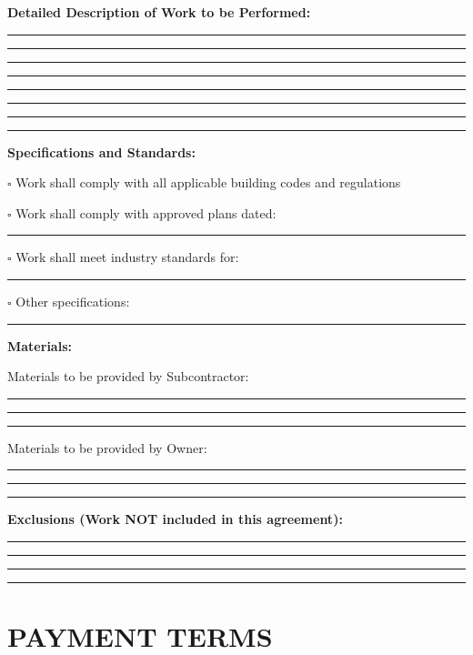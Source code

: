 \documentclass[11pt,letterpaper]{article}
\begin{document}
\textbf{Detailed Description of Work to be Performed:}

\vspace{4pt}

\rule{14cm}{0.4pt}

\rule{14cm}{0.4pt}

\rule{14cm}{0.4pt}

\rule{14cm}{0.4pt}

\rule{14cm}{0.4pt}

\rule{14cm}{0.4pt}

\rule{14cm}{0.4pt}

\rule{14cm}{0.4pt}

\vspace{6pt}

\textbf{Specifications and Standards:}

$\square$ Work shall comply with all applicable building codes and regulations

$\square$ Work shall comply with approved plans dated: \rule{5cm}{0.4pt}

$\square$ Work shall meet industry standards for: \rule{7cm}{0.4pt}

$\square$ Other specifications: \rule{9cm}{0.4pt}

\vspace{6pt}

\textbf{Materials:}

Materials to be provided by Subcontractor:

\rule{14cm}{0.4pt}

\rule{14cm}{0.4pt}

\rule{14cm}{0.4pt}

Materials to be provided by Owner:

\rule{14cm}{0.4pt}

\rule{14cm}{0.4pt}

\rule{14cm}{0.4pt}

\vspace{6pt}

\textbf{Exclusions (Work NOT included in this agreement):}

\rule{14cm}{0.4pt}

\rule{14cm}{0.4pt}

\rule{14cm}{0.4pt}

\rule{14cm}{0.4pt}

\newpage

\section*{PAYMENT TERMS}
\end{document}
